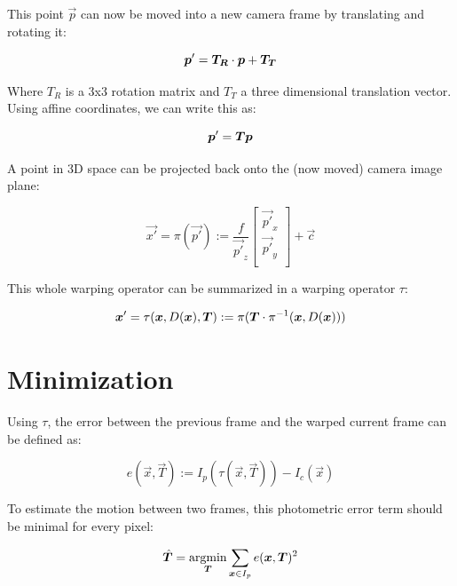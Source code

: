 This point $\vec{p}$ can now be moved into a new camera frame by translating and rotating it:

\begin{equation}
    \vec{p'} = \mat{T_R} \cdot \vec{p} + \vec{T_T}
\end{equation}

Where $T_R$ is a 3x3 rotation matrix and $T_T$ a three dimensional translation
vector. Using affine coordinates, we can write this as:

\begin{equation}
    \vec{p'} = \mat{T} \vec{p}
\end{equation}

A point in 3D space can be projected back onto the (now moved) camera image plane:

\begin{equation}
    \label{eq:projection}
    \vec{x'} = \pi(\vec{p'}) := \frac{f}{\vec{p'}_z}
    \begin{bmatrix}
        \vec{p'}_x \\
        \vec{p'}_y \\
    \end{bmatrix}
    + \vec{c}
\end{equation}

This whole warping operator can be summarized in a warping operator $\tau$:

\begin{equation}
    \vec{x'} = \tau(\vec{x}, D(\vec{x}), \vec{T}) := \pi( \mat{T} \cdot \pi^{-1} (\vec{x}, D(\vec{x})))
\end{equation}



\section{Minimization}

Using $\tau$, the error between the previous frame and the warped current frame can be defined as:

\begin{equation}
    e(\vec{x}, \vec{T}) := I_p(\tau(\vec{x}, \vec{T})) - I_c(\vec{x})
\end{equation}


To estimate the motion between two frames, this photometric error term should
be minimal for every pixel:

\begin{equation}
    \vec{\hat{T}} = \operatornamewithlimits{argmin}_{\vec{T}} \sum_{\vec{x} \in I_p} e(\vec{x}, \vec{T})^2
\end{equation}


